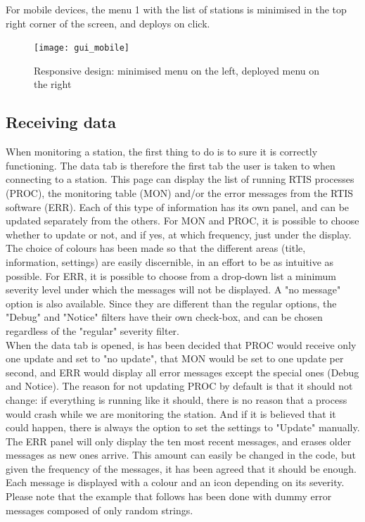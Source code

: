 \documentclass{themeensg}
\begin{document}
For mobile devices, the menu 1 with the list of stations is minimised in the top right corner of the screen, and deploys on click.\\

\begin{figure}[ht]
	\centering
	\texttt{[image: gui\_mobile]}
	\caption{Responsive design: minimised menu on the left, deployed menu on the right}
\end{figure}


\subsection{Receiving data}

When monitoring a station, the first thing to do is to sure it is correctly functioning.  The data tab is therefore the first tab the user is taken to when connecting to a station. This page can display the list of running RTIS processes (PROC), the monitoring table (MON) and/or the error messages from the RTIS software (ERR).
Each of this type of information has its own panel, and can be updated separately from the others. For MON and PROC, it is possible to choose whether to update or not, and if yes, at which frequency, just under the display. The choice of colours has been made so that the different areas (title, information, settings) are easily discernible, in an effort to be as intuitive as possible. For ERR, it is possible to choose from a drop-down list a minimum severity level under which the messages will not be displayed. A "no message" option is also available. Since they are different than the regular options, the "Debug" and "Notice" filters have their own check-box, and can be chosen regardless of the "regular" severity filter. \\

When the data tab is opened, is has been decided that PROC would receive only one update and set to "no update", that MON would be set to one update per second, and ERR would display all error messages except the special ones (Debug and Notice). The reason for not updating PROC by default is that it should not change: if everything is running like it should, there is no reason that a process would crash while we are monitoring the station. And if it is believed that it could happen, there is always the option to set the settings to "Update" manually.\\

The ERR panel will only display the ten most recent messages, and erases older messages as new ones arrive. This amount can easily be changed in the code, but given the frequency of the messages, it has been agreed that it should be enough. Each message is displayed with a colour and an icon depending on its severity. Please note that the example that follows has been done with dummy error messages composed of only random strings.\\
\end{document}
